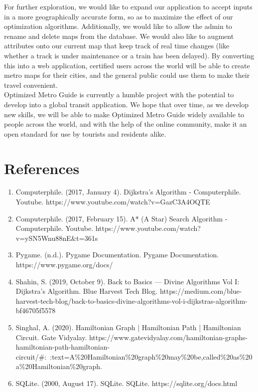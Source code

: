 \documentclass[fontsize=11pt]{article}
\begin{document}
    For further exploration, we would like to expand our application to accept inputs in a more geographically accurate form, so as to maximize the effect of our optimization algorithms. Additionally, we would like to allow the admin to rename and delete maps from the database. We would also like to augment attributes onto our current map that keep track of real time changes (like whether a track is under maintenance or a train has been delayed). By converting this into a web application, certified users across the world will be able to create metro maps for their cities, and the general public could use them to make their travel convenient. \\

    Optimized Metro Guide is currently a humble project with the potential to develop into a global transit application. We hope that over time, as we develop new skills, we will be able to make Optimized Metro Guide widely available to people across the world, and with the help of the online community, make it an open standard for use by tourists and residents alike.
    \section*{References}
    \begin{enumerate}
        \item Computerphile. (2017, January 4). Dijkstra's Algorithm - Computerphile. Youtube. https://www.youtube.com/watch?v=GazC3A4OQTE
        \item Computerphile. (2017, February 15). A* (A Star) Search Algorithm - Computerphile. Youtube. https://www.youtube.com/watch?v=ySN5Wnu88nE\&t=361s
        \item Pygame. (n.d.). Pygame Documentation. Pygame Documentation. https://www.pygame.org/docs/
        \item Shahin, S. (2019, October 9). Back to Basics — Divine Algorithms Vol I: Dijkstra’s Algorithm. Blue Harvest Tech Blog. https://medium.com/blue-harvest-tech-blog/back-to-basics-divine-algorithms-vol-i-dijkstras-algorithm-bf46705f5578
        \item Singhal, A. (2020). Hamiltonian Graph | Hamiltonian Path | Hamiltonian Circuit. Gate Vidyalay. https://www.gatevidyalay.com/hamiltonian-graphs-hamiltonian-path-hamiltonian-circuit/\#:~:text=A\%20Hamiltonian\%20graph\%20may\%20be,called\%20as\%20a\%20Hamiltonian\%20graph.
        \item SQLite. (2000, August 17). SQLite. SQLite. https://sqlite.org/docs.html

    \end{enumerate}


\end{document}

